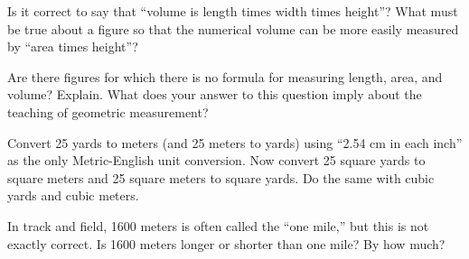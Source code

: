 \begin{prob}
 Is it correct to say that ``volume is length times width times height''? What must be true about a figure so that the numerical volume can be more easily measured by ``area times height''?
\end{prob}

\begin{prob}
Are there figures for which there is no formula for measuring length, area, and volume?  Explain.  What does your answer to this question imply about the teaching of geometric measurement?
\end{prob}

\begin{prob}
Convert 25 yards to meters (and 25 meters to yards) using ``2.54 cm in each inch'' as the only Metric-English unit conversion.  Now convert 25 square yards to square meters and 25 square meters to square yards.  Do the same with cubic yards and cubic meters.
\end{prob}

\begin{prob}
In track and field, 1600 meters is often called the ``one mile,'' but this is not exactly correct.  Is 1600 meters longer or shorter than one mile?  By how much?  
\end{prob}

